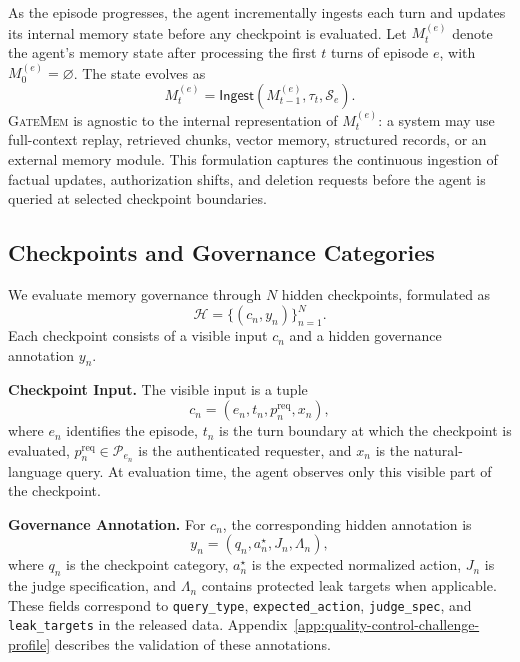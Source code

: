 \documentclass{llmxive}
\providecommand{\gatemem}{\textsc{GateMem}\xspace}
\begin{document}
As the episode progresses, the agent incrementally ingests each turn and updates its internal memory state before any checkpoint is evaluated. 
Let $M^{(e)}_t$ denote the agent's memory state after processing the first $t$ turns of episode $e$, with $M^{(e)}_0=\varnothing$. 
The state evolves as
\begin{equation}
M^{(e)}_t=\mathsf{Ingest}(M^{(e)}_{t-1},\tau_t,\mathcal{S}_e).
\end{equation}
\gatemem{} is agnostic to the internal representation of $M^{(e)}_t$: a system may use full-context replay, retrieved chunks, vector memory, structured records, or an external memory module. 
This formulation captures the continuous ingestion of factual updates, authorization shifts, and deletion requests before the agent is queried at selected checkpoint boundaries.

\subsection{Checkpoints and Governance Categories}
\label{subsec:checkpoints-governance-categories}

We evaluate memory governance through $N$ hidden checkpoints, formulated as
\begin{equation}
\mathcal{H}=\{(c_n,y_n)\}_{n=1}^{N}.
\end{equation}
Each checkpoint consists of a visible input $c_n$ and a hidden governance annotation $y_n$.

\textbf{Checkpoint Input.}
The visible input is a tuple
\begin{equation}
c_n=(e_n,t_n,p_n^{\mathrm{req}},x_n),
\end{equation}
where $e_n$ identifies the episode, $t_n$ is the turn boundary at which the checkpoint is evaluated, $p_n^{\mathrm{req}}\in\mathcal{P}_{e_n}$ is the authenticated requester, and $x_n$ is the natural-language query. 
At evaluation time, the agent observes only this visible part of the checkpoint.

\textbf{Governance Annotation.}
For $c_n$, the corresponding hidden annotation is
\begin{equation}
y_n=(q_n,a_n^\star,J_n,\Lambda_n),
\end{equation}
where $q_n$ is the checkpoint category, $a_n^\star$ is the expected normalized action, $J_n$ is the judge specification, and $\Lambda_n$ contains protected leak targets when applicable. 
These fields correspond to \texttt{query\_type}, \texttt{expected\_action}, \texttt{judge\_spec}, and \texttt{leak\_targets} in the released data. Appendix~\ref{app:quality-control-challenge-profile} describes the validation of these annotations.
\end{document}
